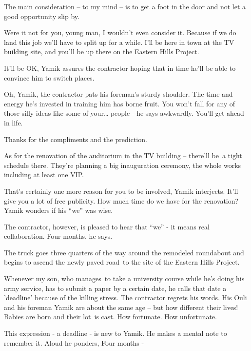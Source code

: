 \documentclass[letterpaper]{article}
\begin{document}
{\textquotedbl}The main consideration -- to my mind -- is to get a foot in the door and not let a good opportunity slip
by.{\textquotedbl} \ 

{\textquotedbl}Were it not for you, young man, I wouldn't even consider it. Because if we do land this job we'll have to
split up for a while. I'll be here in town at the TV building site, and you'll be up there on the Eastern Hills
Project.{\textquotedbl} 

{\textquotedbl}It'll be OK,{\textquotedbl} Yamik assures the contractor hoping that in time he'll be able to convince
him to switch places.\ ~

{\textquotedbl}Oh, Yamik,{\textquotedbl} the contractor pats his foreman's sturdy shoulder. The time and energy he's
invested in training him has borne fruit. {\textquotedbl}You won't fall for any of those silly ideas like some of
your{\dots} people -{\textquotedbl} he says awkwardly. {\textquotedbl}You'll get ahead in life.{\textquotedbl} 

{\textquotedbl}Thanks for the compliments and the prediction.{\textquotedbl} 

{\textquotedbl}As for the renovation of the auditorium in the TV building -- there'll be~a tight schedule there. They're
planning a big inauguration ceremony, the whole works including at least one VIP.{\textquotedbl} 

{\textquotedbl}That's certainly one more reason for you to be involved,{\textquotedbl} Yamik interjects.
{\textquotedbl}It'll give you a lot of free publicity. How much time do we have for the renovation?{\textquotedbl}
Yamik wonders if his ``we'' was wise.

The contractor, however, is pleased to hear that ``we'' - it means real collaboration. {\textquotedbl}Four
months.{\textquotedbl} he says.\ 

The truck goes three quarters of the way around the remodeled roundabout and begins to ascend the newly paved road~to
the site of the Eastern Hills Project. 

{\textquotedbl}Whenever my son, who manages\textcolor{red}{\ }to take a university course while he's doing his army
service, has to submit a paper by a certain date, he calls that date a 'deadline' because of the killing
stress.{\textquotedbl} The contractor regrets his words. His Ouli and his foreman Yamik are about the same age -- but
how different their lives! Babies are born and their lot~is cast. How fortunate. How unfortunate.

This expression - {\textquotedbl}a deadline{\textquotedbl} - is new to Yamik. He makes a mental note to remember it.
Aloud he ponders, {\textquotedbl}Four months -{\textquotedbl}
\end{document}
